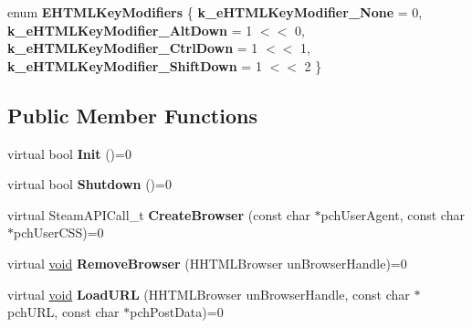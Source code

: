 \begin{DoxyCompactItemize}
\item 
\hypertarget{classISteamHTMLSurface_a099a4ad38c6f926829aceb4b13ca9124}{}enum {\bfseries E\+H\+T\+M\+L\+Key\+Modifiers} \{ {\bfseries k\+\_\+e\+H\+T\+M\+L\+Key\+Modifier\+\_\+\+None} = 0, 
{\bfseries k\+\_\+e\+H\+T\+M\+L\+Key\+Modifier\+\_\+\+Alt\+Down} = 1 $<$$<$ 0, 
{\bfseries k\+\_\+e\+H\+T\+M\+L\+Key\+Modifier\+\_\+\+Ctrl\+Down} = 1 $<$$<$ 1, 
{\bfseries k\+\_\+e\+H\+T\+M\+L\+Key\+Modifier\+\_\+\+Shift\+Down} = 1 $<$$<$ 2
 \}\label{classISteamHTMLSurface_a099a4ad38c6f926829aceb4b13ca9124}

\end{DoxyCompactItemize}
\subsection*{Public Member Functions}
\begin{DoxyCompactItemize}
\item 
\hypertarget{classISteamHTMLSurface_a1bd2c165e2cdd316e4f227a6adf3d98b}{}virtual bool {\bfseries Init} ()=0\label{classISteamHTMLSurface_a1bd2c165e2cdd316e4f227a6adf3d98b}

\item 
\hypertarget{classISteamHTMLSurface_a0e44754a153eca6ebd9cd4e8d7d60ccc}{}virtual bool {\bfseries Shutdown} ()=0\label{classISteamHTMLSurface_a0e44754a153eca6ebd9cd4e8d7d60ccc}

\item 
\hypertarget{classISteamHTMLSurface_ae44cef213b858f70df2a4142cec93356}{}virtual Steam\+A\+P\+I\+Call\+\_\+t {\bfseries Create\+Browser} (const char $\ast$pch\+User\+Agent, const char $\ast$pch\+User\+C\+S\+S)=0\label{classISteamHTMLSurface_ae44cef213b858f70df2a4142cec93356}

\item 
\hypertarget{classISteamHTMLSurface_a6033a643a13112972847fc73532b1fe8}{}virtual \hyperlink{SDL__audio_8h_a52835ae37c4bb905b903cbaf5d04b05f}{void} {\bfseries Remove\+Browser} (H\+H\+T\+M\+L\+Browser un\+Browser\+Handle)=0\label{classISteamHTMLSurface_a6033a643a13112972847fc73532b1fe8}

\item 
\hypertarget{classISteamHTMLSurface_a1d5a21a85db5535b4a05fbab739539e2}{}virtual \hyperlink{SDL__audio_8h_a52835ae37c4bb905b903cbaf5d04b05f}{void} {\bfseries Load\+U\+R\+L} (H\+H\+T\+M\+L\+Browser un\+Browser\+Handle, const char $\ast$pch\+U\+R\+L, const char $\ast$pch\+Post\+Data)=0\label{classISteamHTMLSurface_a1d5a21a85db5535b4a05fbab739539e2}


\end{DoxyCompactItemize}

